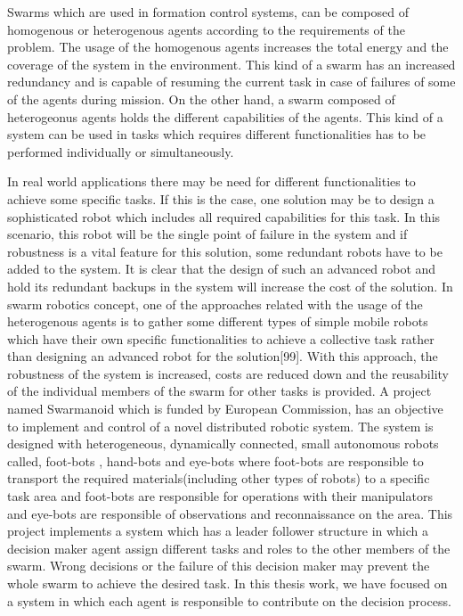 Swarms which are used in formation control systems, can be composed of homogenous or heterogenous agents according to the requirements of the problem. The usage of the homogenous agents increases the total energy and the coverage of the system in the environment. This kind of a swarm has an increased redundancy and is capable of resuming the current task in case of failures of some of the agents during mission. On the other hand, a swarm composed of heterogeonus agents holds the different capabilities of the agents. This kind of a system can be used in tasks which requires different functionalities has to be performed individually or simultaneously.

In real world applications there may be need for different  functionalities to achieve some specific tasks. If this is the case, one solution may be to design a sophisticated robot which includes all required capabilities for this task. In this scenario, this robot will be the single point of failure in the system and if robustness is a  vital feature for this solution, some redundant robots have to be added to the system. It is clear that the design of such an advanced robot and hold its redundant backups in the system will increase the cost of the solution. In swarm robotics concept, one of the approaches related with the usage of the heterogenous agents is to gather some different types of simple mobile robots which have their own specific functionalities to achieve a collective task rather than designing an advanced robot for the solution[99]. With this approach, the robustness of the system is increased, costs are reduced down and the reusability of the individual members of the swarm for other tasks is provided.  A project named Swarmanoid which is funded by European Commission, has an objective to implement and control of a novel distributed robotic system. The system is designed with heterogeneous, dynamically connected, small autonomous robots called,  foot-bots , hand-bots and eye-bots where foot-bots are responsible to transport the required materials(including other types of robots) to a specific task area and foot-bots are responsible for operations with their manipulators and eye-bots are responsible of observations and reconnaissance on the area. This project implements a system which has a leader follower structure in which a decision maker agent assign different tasks and roles to the other members of the swarm. Wrong decisions or the failure of this decision maker may prevent the whole swarm to achieve the desired task. In this thesis work, we have focused on a system in which each agent is responsible to contribute on the decision process.

